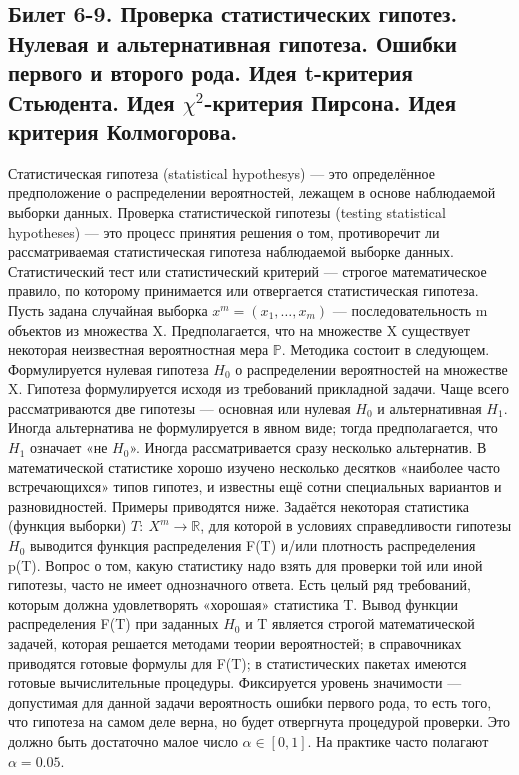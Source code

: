 \documentclass[a4paper, 12pt]{article}
\begin{document}
	\subsection*{Билет 6-9. Проверка статистических гипотез. Нулевая и альтернативная гипотеза. Ошибки первого и второго рода. Идея t-критерия Стьюдента. Идея $\chi^{2}$-критерия Пирсона. Идея критерия Колмогорова.}
	Статистическая гипотеза (statistical hypothesys) — это определённое предположение о распределении вероятностей, лежащем в основе наблюдаемой выборки данных.
	Проверка статистической гипотезы (testing statistical hypotheses) — это процесс принятия решения о том, противоречит ли рассматриваемая статистическая гипотеза наблюдаемой выборке данных.
	Статистический тест или статистический критерий — строгое математическое правило, по которому принимается или отвергается статистическая гипотеза.
	Пусть задана случайная выборка $x^m = (x_1,\ldots,x_m)$ — последовательность m объектов из множества X. Предполагается, что на множестве X существует некоторая неизвестная вероятностная мера $\mathbb{P}$.
	Методика состоит в следующем.
	Формулируется нулевая гипотеза $H_0$ о распределении вероятностей на множестве X. Гипотеза формулируется исходя из требований прикладной задачи. Чаще всего рассматриваются две гипотезы — основная или нулевая $H_0$ и альтернативная $H_1$. Иногда альтернатива не формулируется в явном виде; тогда предполагается, что $H_1$ означает «не $H_0$». Иногда рассматривается сразу несколько альтернатив. В математической статистике хорошо изучено несколько десятков «наиболее часто встречающихся» типов гипотез, и известны ещё сотни специальных вариантов и разновидностей. Примеры приводятся ниже.
	Задаётся некоторая статистика (функция выборки) $T:\: X^m \to \mathbb{R}$, для которой в условиях справедливости гипотезы $H_0$ выводится функция распределения F(T) и/или плотность распределения p(T). Вопрос о том, какую статистику надо взять для проверки той или иной гипотезы, часто не имеет однозначного ответа. Есть целый ряд требований, которым должна удовлетворять «хорошая» статистика T. Вывод функции распределения F(T) при заданных $H_0$ и T является строгой математической задачей, которая решается методами теории вероятностей; в справочниках приводятся готовые формулы для F(T); в статистических пакетах имеются готовые вычислительные процедуры.
	Фиксируется уровень значимости — допустимая для данной задачи вероятность ошибки первого рода, то есть того, что гипотеза на самом деле верна, но будет отвергнута процедурой проверки. Это должно быть достаточно малое число $\alpha \in [0,1]$. На практике часто полагают $\alpha=0.05$.
\end{document}
